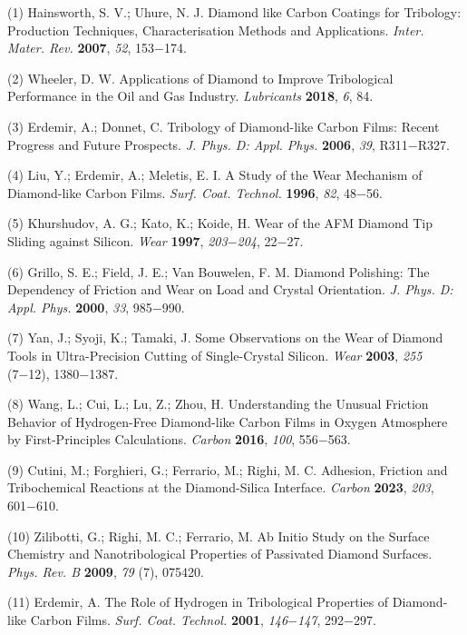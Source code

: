 \documentclass{article}
\begin{document}
\begin{hangpars}\small
(1) Hainsworth, S. V.; Uhure, N. J. Diamond like Carbon Coatings for Tribology: Production Techniques, Characterisation Methods and Applications. \textit{Inter. Mater. Rev.} \textbf{2007}, \textit{52}, 153−174.

(2) Wheeler, D. W. Applications of Diamond to Improve Tribological Performance in the Oil and Gas Industry. \textit{Lubricants} \textbf{2018}, \textit{6}, 84.

(3) Erdemir, A.; Donnet, C. Tribology of Diamond-like Carbon Films: Recent Progress and Future Prospects. \textit{J. Phys. D: Appl. Phys.} \textbf{2006}, \textit{39}, R311−R327.

(4) Liu, Y.; Erdemir, A.; Meletis, E. I. A Study of the Wear Mechanism of Diamond-like Carbon Films. \textit{Surf. Coat. Technol.} \textbf{1996}, \textit{82}, 48−56.

(5) Khurshudov, A. G.; Kato, K.; Koide, H. Wear of the AFM Diamond Tip Sliding against Silicon. \textit{Wear} \textbf{1997}, \textit{203}−\textit{204}, 22−27.

(6) Grillo, S. E.; Field, J. E.; Van Bouwelen, F. M. Diamond Polishing: The Dependency of Friction and Wear on Load and Crystal Orientation. \textit{J. Phys. D: Appl. Phys.} \textbf{2000}, \textit{33}, 985−990.

(7) Yan, J.; Syoji, K.; Tamaki, J. Some Observations on the Wear of Diamond Tools in Ultra-Precision Cutting of Single-Crystal Silicon. \textit{Wear} \textbf{2003}, \textit{255} (7−12), 1380−1387.

(8) Wang, L.; Cui, L.; Lu, Z.; Zhou, H. Understanding the Unusual Friction Behavior of Hydrogen-Free Diamond-like Carbon Films in Oxygen Atmosphere by First-Principles Calculations. \textit{Carbon} \textbf{2016}, \textit{100}, 556−563.

(9) Cutini, M.; Forghieri, G.; Ferrario, M.; Righi, M. C. Adhesion, Friction and Tribochemical Reactions at the Diamond-Silica Interface. \textit{Carbon} \textbf{2023}, \textit{203}, 601−610.

(10) Zilibotti, G.; Righi, M. C.; Ferrario, M. Ab Initio Study on the Surface Chemistry and Nanotribological Properties of Passivated Diamond Surfaces. \textit{Phys. Rev. B} \textbf{2009}, \textit{79} (7), 075420.

(11) Erdemir, A. The Role of Hydrogen in Tribological Properties of Diamond-like Carbon Films. \textit{Surf. Coat. Technol.} \textbf{2001}, \textit{146}−\textit{147}, 292−297.


\end{hangpars}
\end{document}
